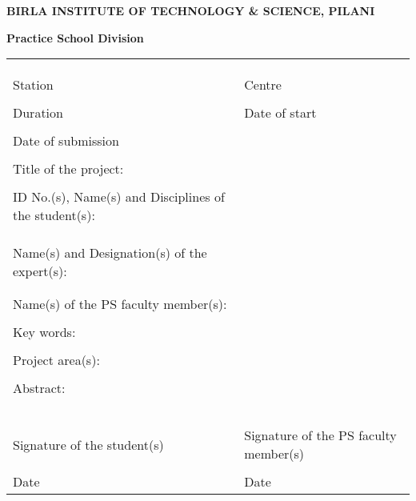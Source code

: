 \documentclass{book}
\begin{document}
\thispagestyle{empty}

	\centerline{\bf BIRLA INSTITUTE OF TECHNOLOGY \& SCIENCE, PILANI}
	\vspace*{0.2cm}
	\centerline{\bf Practice School Division}
	\vspace*{0.3cm}
	{\bf 
		\begin{tabular}{p{6cm}l}
			& \\
			& \\
			& \\
			Station & \hspace*{3cm} Centre \\ %
			& \\
			Duration &\hspace*{3cm} Date of start \\ %
			& \\
			Date of submission & {} \\ %
			& \\
			Title of the project: & \\ %
			& \\
			ID No.(s), Name(s) and Disciplines of the student(s): & \\
			& \\ %
			& \\ %
			& \\ %
			Name(s) and Designation(s) of the expert(s): & \\
			& \\ %
			& \\ %
			Name(s) of the PS faculty member(s): & \\
			& \\ %
			Key words: & \\ %
			& \\
			Project area(s):  & \\ %
			& \\
			Abstract: & \\ %
			& \\
			& \\
			& \\
			& \\
			& \\
			Signature of the student(s) & \hspace*{1cm}Signature of the PS faculty member(s) \\
			& \\
			Date & \hspace*{1cm}Date \\ %
		\end{tabular}}
\end{document}
